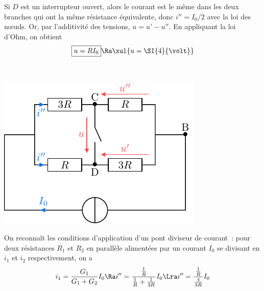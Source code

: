 \documentclass[a4paper, 10pt, garamond, oneside]{book}
\begin{document}
{\begin{enumerate}
     \noindent
		      \begin{minipage}[t]{0.55\linewidth}
			      Si $D$ est un interrupteur ouvert, alors le courant est le même
			      dans les deux branches qui ont la même résistance équivalente,
			      donc $i''=I_0/2$ avec la loi des nœuds.
            \smallbreak
			      Or, par l'additivité des tensions, $u=u'-u''$. En appliquant la loi
            d'Ohm, on obtient
            \[
              \boxed{u = RI_0}
              \Ra
              \xul{u = \SI{4}{\volt}}
            \]
		      \end{minipage}
          \hfill
		      \begin{minipage}[t]{0.4\linewidth}
            ~
            \vspace{-40pt}
			      \begin{center}
		          \includegraphics[width=\linewidth]{diplin_q6}
			      \end{center}
		      \end{minipage}
     \noindent
		      \begin{minipage}[t]{0.55\linewidth}
            On reconnaît les conditions d'application d'un pont diviseur de
            courant~: pour deux résistances $R_1$ et $R_2$ en parallèle
            alimentées par un courant $I_0$ se divisant en $i_1$ et $i_2$
            respectivement, on a
            \begin{gather*}
              i_1 = \frac{G_1}{G_1+G_2}I_0
              \Ra
              i'' = \frac{\frac{1}{R}}{\frac{1}{R}+\frac{1}{3R}}I_0
              \Lra
              i'' = \frac{\frac{1}{R}}{\frac{4}{3R}}I_0

\end{gather*}
\end{minipage}
\end{enumerate}}
\end{document}
